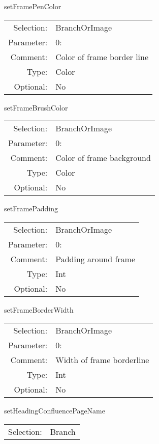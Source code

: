 \item setFramePenColor\\
\begin{tabular}{rl}
  Selection: & BranchOrImage\\
   Parameter: &  0:\\
        Comment: & Color of frame border line\\
           Type: & Color\\
       Optional: &  No\\
\end{tabular}

\item setFrameBrushColor\\
\begin{tabular}{rl}
  Selection: & BranchOrImage\\
   Parameter: &  0:\\
        Comment: & Color of frame background\\
           Type: & Color\\
       Optional: &  No\\
\end{tabular}

\item setFramePadding\\
\begin{tabular}{rl}
  Selection: & BranchOrImage\\
   Parameter: &  0:\\
        Comment: & Padding around frame\\
           Type: & Int\\
       Optional: &  No\\
\end{tabular}

\item setFrameBorderWidth\\
\begin{tabular}{rl}
  Selection: & BranchOrImage\\
   Parameter: &  0:\\
        Comment: & Width of frame borderline\\
           Type: & Int\\
       Optional: &  No\\
\end{tabular}

\item setHeadingConfluencePageName\\
\begin{tabular}{rl}
  Selection: & Branch\\
\end{tabular}

